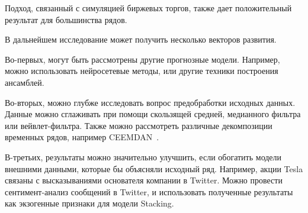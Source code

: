\documentclass[a4paper,article,14pt]{extarticle}
\begin{document}
\par
Подход, связанный с симуляцией биржевых торгов, также дает положительный результат для большинства рядов.

\par
В дальнейшем исследование может получить несколько векторов развития.
\par
Во-первых, могут быть рассмотрены другие прогнозные модели.
Например, можно использовать нейросетевые методы, или другие техники построения ансамблей.
\par
Во-вторых, можно глубже исследовать вопрос предобработки исходных данных.
Данные можно сглаживать при помощи скользящей средней, медианного фильтра или вейвлет-фильтра.
Также можно рассмотреть различные декомпозиции временных рядов, например CEEMDAN~\cite{lstm_ex2}.
\par
В-третьих, результаты можно значительно улучшить, если обогатить модели внешними данными, которые бы объясняли исходный ряд.
Например, акции Tesla связаны с высказываниями основателя компании в Twitter.
Можно провести сентимент-анализ сообщений в Twitter, и использовать полученные результаты как экзогенные признаки для модели Stacking.

\pagebreak
\end{document}
